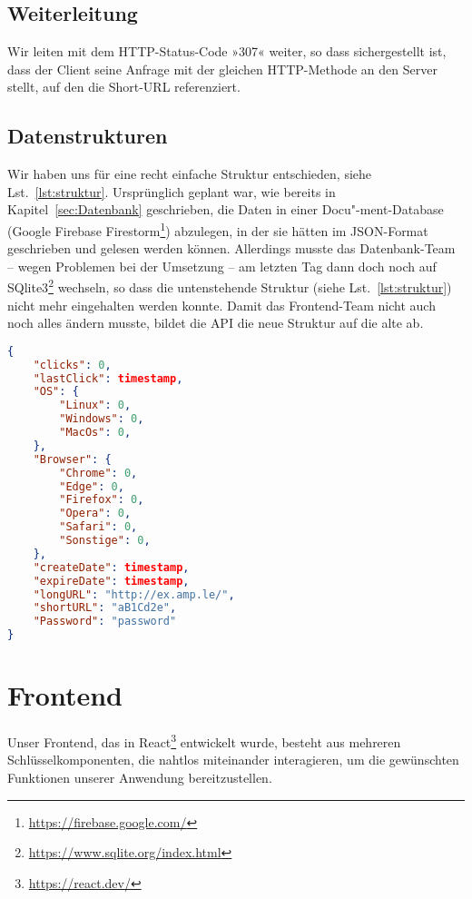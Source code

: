 \documentclass[a4paper,11pt,DIV=12]{scrreprt}%
\begin{document}
\subsection{Weiterleitung}
Wir leiten mit dem HTTP-Status-Code »307« weiter, so dass sichergestellt ist, dass der Client seine Anfrage mit der gleichen HTTP-Methode an den Server stellt, auf den die Short-\ac{URL} referenziert.
\subsection{Datenstrukturen}
Wir haben uns für eine recht einfache Struktur entschieden, siehe Lst.~\ref{lst:struktur}. Ursprünglich geplant war, wie bereits in Kapitel~\ref{sec:Datenbank} geschrieben, die Daten in einer Docu"-ment-Database (Google Firebase Firestorm\footnote{\href{https://firebase.google.com/}{https://firebase.google.com/}}) abzulegen, in der sie hätten im \ac{JSON}-Format geschrieben und gelesen werden können. Allerdings musste das Datenbank-Team – wegen Problemen bei der Umsetzung – am letzten Tag dann doch noch auf SQlite3\footnote{\href{https://www.sqlite.org/index.html}{https://www.sqlite.org/index.html}} wechseln, so dass die untenstehende Struktur (siehe Lst.~\ref{lst:struktur}) nicht mehr eingehalten werden konnte. Damit das Frontend-Team nicht auch noch alles ändern musste, bildet die \ac{API} die neue Struktur auf die alte ab.

\begin{lstlisting}[language=json,
    float=h,
    caption={Aufbau der Datenstruktur für jede Kurz-Url},
    label={lst:struktur}]
{
    "clicks": 0,
    "lastClick": timestamp,
    "OS": {
        "Linux": 0,
        "Windows": 0,
        "MacOs": 0,
    },
    "Browser": {
        "Chrome": 0,
        "Edge": 0,
        "Firefox": 0,
        "Opera": 0,
        "Safari": 0,
        "Sonstige": 0,
    },
    "createDate": timestamp,
    "expireDate": timestamp,
    "longURL": "http://ex.amp.le/",
    "shortURL": "aB1Cd2e",
    "Password": "password"
}
\end{lstlisting}

\section{Frontend}

Unser Frontend, das in React\footnote{\href{https://react.dev/}{https://react.dev/}} entwickelt wurde, besteht aus mehreren Schlüsselkomponenten, die nahtlos miteinander interagieren, um die gewünschten Funktionen unserer Anwendung bereitzustellen.
\end{document}

